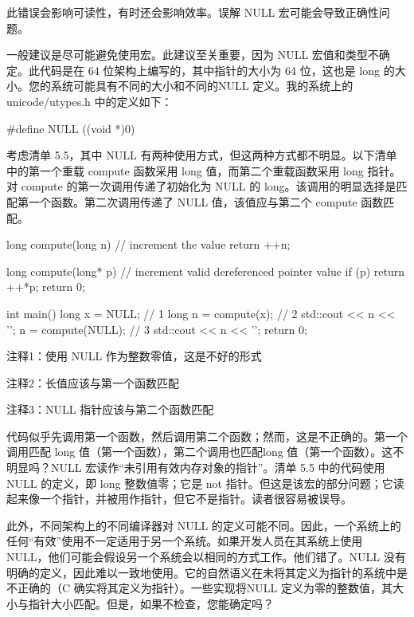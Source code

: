 此错误会影响可读性，有时还会影响效率。误解 NULL 宏可能会导致正确性问题。


一般建议是尽可能避免使用宏。此建议至关重要，因为 NULL 宏值和类型不确定。此代码是在 64 位架构上编写的，其中指针的大小为 64 位，这也是 long 的大小。您的系统可能具有不同的大小和不同的NULL 定义。我的系统上的 unicode/utypes.h 中的定义如下：

\begin{cpp}
#define NULL ((void *)0)
\end{cpp}

考虑清单 5.5，其中 NULL 有两种使用方式，但这两种方式都不明显。以下清单中的第一个重载 compute 函数采用 long 值，而第二个重载函数采用 long 指针。对 compute 的第一次调用传递了初始化为 NULL 的 long。该调用的明显选择是匹配第一个函数。第二次调用传递了 NULL 值，该值应与第二个 compute 函数匹配。


\begin{cpp}
long compute(long n) { // increment the value
  return ++n;
}

long compute(long* p) { // increment valid dereferenced pointer value
  if (p)
    return ++*p;
  return 0;
}

int main() {
  long x = NULL; // 1
  long n = compute(x); // 2
  std::cout << n << '\n';
  n = compute(NULL); // 3
  std::cout << n << '\n';
  return 0;
}
\end{cpp}

{\footnotesize
注释1：使用 NULL 作为整数零值，这是不好的形式

注释2：长值应该与第一个函数匹配

注释3：NULL 指针应该与第二个函数匹配
}


代码似乎先调用第一个函数，然后调用第二个函数；然而，这是不正确的。第一个调用匹配 long 值（第一个函数），第二个调用也匹配long 值（第一个函数）。这不明显吗？NULL 宏读作“未引用有效内存对象的指针”。清单 5.5 中的代码使用 NULL 的定义，即 long 整数值零；它是 not 指针。但这是该宏的部分问题；它读起来像一个指针，并被用作指针，但它不是指针。读者很容易被误导。

此外，不同架构上的不同编译器对 NULL 的定义可能不同。因此，一个系统上的任何“有效”使用不一定适用于另一个系统。如果开发人员在其系统上使用 NULL，他们可能会假设另一个系统会以相同的方式工作。他们错了。NULL 没有明确的定义，因此难以一致地使用。它的自然语义在未将其定义为指针的系统中是不正确的（C 确实将其定义为指针）。一些实现将NULL 定义为零的整数值，其大小与指针大小匹配。但是，如果不检查，您能确定吗？

